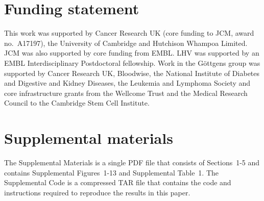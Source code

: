 \documentclass{article}
\newcommand{\suppfigindex}{13}
\newcommand{\suppsecsim}{5}
\begin{document}
\section*{Funding statement}
This work was supported by Cancer Research UK (core funding to JCM, award no.\ A17197), the University of Cambridge and Hutchison Whampoa Limited.
JCM was also supported by core funding from EMBL.
LHV was supported by an EMBL Interdisciplinary Postdoctoral fellowship.
Work in the G\"ottgens group was supported by Cancer Research UK, Bloodwise, the National Institute of Diabetes and Digestive and Kidney Diseases, the Leukemia and Lymphoma Society and core infrastructure grants from the Wellcome Trust and the Medical Research Council to the Cambridge Stem Cell Institute.

\section*{Supplemental materials}
The Supplemental Materials is a single PDF file that consists of Sections~1-\suppsecsim{} and contains Supplemental Figures~1-\suppfigindex{} and Supplemental Table~1.
The Supplemental Code is a compressed TAR file that contains the code and instructions required to reproduce the results in this paper.

\printbibliography
\end{document}
